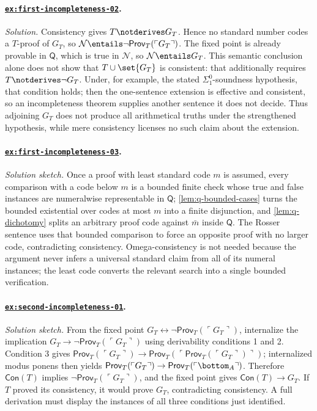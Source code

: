 \paragraph{\hyperref[ex:first-incompleteness-02]{\texttt{ex:first-incompleteness-02}}.}
\textit{Solution.}  Consistency gives \(T\notderives G_T\).  Hence no standard
number codes a \(T\)-proof of \(G_T\), so
\(\mathcal N\entails\neg\mathsf{Prov}_T(\ulcorner G_T\urcorner)\).  The fixed
point is already provable in \(\mathsf Q\), which is true in \(\mathcal N\),
so \(\mathcal N\entails G_T\).  This semantic conclusion alone does not show
that \(T\cup\set{G_T}\) is consistent: that additionally requires
\(T\notderives\neg G_T\).  Under, for example, the stated
\(\Sigma^0_1\)-soundness hypothesis, that condition holds; then the one-sentence
extension is effective and consistent, so an incompleteness theorem supplies
another sentence it does not decide.  Thus adjoining \(G_T\) does not produce
all arithmetical truths under the strengthened hypothesis, while mere
consistency licenses no such claim about the extension.

\paragraph{\hyperref[ex:first-incompleteness-03]{\texttt{ex:first-incompleteness-03}}.}
\textit{Solution sketch.}  Once a proof with least standard code \(m\) is
assumed, every comparison with a code below \(m\) is a bounded finite check
whose true and false instances are numeralwise representable in \(\mathsf Q\);
\cref{lem:q-bounded-cases} turns the bounded existential over codes at most
\(m\) into a finite disjunction, and \cref{lem:q-dichotomy} splits an
arbitrary proof code against \(\bar m\) inside \(\mathsf Q\).
The Rosser sentence uses that bounded comparison to force an opposite proof
with no larger code, contradicting consistency.  Omega-consistency is not
needed because the argument never infers a universal standard claim from all
of its numeral instances; the least code converts the relevant search into a
single bounded verification.

\paragraph{\hyperref[ex:second-incompleteness-01]{\texttt{ex:second-incompleteness-01}}.}
\textit{Solution sketch.}  From the fixed point
\(G_T\leftrightarrow\neg\mathsf{Prov}_T(\ulcorner G_T\urcorner)\), internalize
the implication \(G_T\to\neg\mathsf{Prov}_T(\ulcorner G_T\urcorner)\) using
derivability conditions 1 and 2.  Condition 3 gives
\(\mathsf{Prov}_T(\ulcorner G_T\urcorner)\to
\mathsf{Prov}_T(\ulcorner
  \mathsf{Prov}_T(\ulcorner G_T\urcorner)\urcorner)\); internalized
modus ponens then yields
\(\mathsf{Prov}_T(\ulcorner G_T\urcorner)\to
\mathsf{Prov}_T(\ulcorner\bottom_A\urcorner)\).  Therefore
\(\mathsf{Con}(T)\) implies
\(\neg\mathsf{Prov}_T(\ulcorner G_T\urcorner)\), and the fixed point
gives \(\mathsf{Con}(T)\to G_T\).  If \(T\) proved its consistency, it would
prove \(G_T\), contradicting consistency.  A full derivation must display the
instances of all three conditions just identified.

